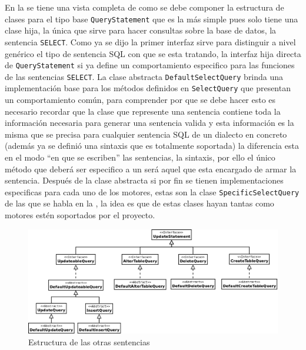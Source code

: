 En la  se tiene una vista completa de como se debe componer la estructura de clases para el tipo base \verb=QueryStatement= que es la más simple pues solo tiene una clase hija, la única que sirve para hacer consultas sobre la base de datos, la sentencia \verb=SELECT=. Como ya se dijo la primer interfaz sirve para distinguir a nivel genérico el tipo de sentencia SQL con que se esta tratando, la interfaz hija directa de \verb=QueryStatement= si ya define un comportamiento especifico para las funciones de las sentencias \verb=SELECT=. La clase abstracta \verb=DefaultSelectQuery= brinda una implementación base para los métodos definidos en \verb=SelectQuery= que presentan un comportamiento común, para comprender por que se debe hacer esto es necesario recordar que la clase que represente una sentencia contiene toda la información necesaria para generar una sentencia valida y esta información es la misma que se precisa para cualquier sentencia SQL de un dialecto en concreto (además ya se definió una sintaxis que es totalmente soportada) la diferencia esta en el modo ``en que se escriben'' las sentencias, la sintaxis, por ello el único método que deberá ser especifico a un \dd será aquel que esta encargado de armar la sentencia. Después de la clase abstracta si por fin se tienen implementaciones especificas para cada uno de los motores, estas son la clase \verb=SpecificSelectQuery= de las que se habla en la , la idea es que de estas clases hayan tantas como motores estén soportados por el proyecto.
%
\begin{figure}[h]
  \centering
    \includegraphics[width=\textwidth]{figuras/crossdb-update.png}
  \caption{Estructura de las otras sentencias}
  \label{fig:update}
\end{figure}

